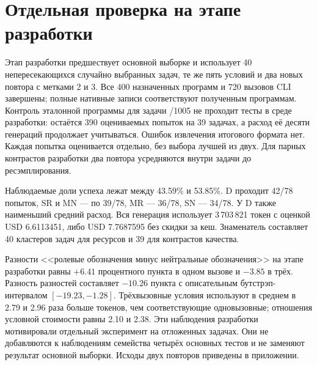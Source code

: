 \section{Отдельная проверка на этапе разработки}
\label{sec:dev40-results}
Этап разработки предшествует основной выборке и использует 40 непересекающихся случайно выбранных задач, те же пять условий и два новых повтора с метками 2 и 3. Все 400 назначенных программ и 720 вызовов CLI завершены; полные нативные записи соответствуют полученным программам. Контроль эталонной программы для задачи /1005 не проходит тесты в среде разработки: остаётся 390 оцениваемых попыток на 39 задачах, а расход её десяти генераций продолжает учитываться. Ошибок извлечения итогового формата нет. Каждая попытка оценивается отдельно, без выбора лучшей из двух. Для парных контрастов разработки два повтора усредняются внутри задачи до ресэмплирования.



Наблюдаемые доли успеха лежат между 43.59\% и 53.85\%. D проходит 42/78 попыток, SR и MN --- по 39/78, MR --- 36/78, SN --- 34/78. У D также наименьший средний расход. Вся генерация использует 3\,703\,821 токен с оценкой USD 6.6113451, либо USD 7.7687595 без скидки за кеш. Знаменатель составляет 40 кластеров задач для ресурсов и 39 для контрастов качества.



Разности <<ролевые обозначения минус нейтральные обозначения>> на этапе разработки равны $+6.41$ процентного пункта в одном вызове и $-3.85$ в трёх. Разность разностей составляет $-10.26$ пункта с описательным бутстрэп-интервалом $[-19.23,-1.28]$. Трёхвызовные условия используют в среднем в 2.79 и 2.96 раза больше токенов, чем соответствующие одновызовные; отношения условной стоимости равны 2.10 и 2.38. Эти наблюдения разработки мотивировали отдельный эксперимент на отложенных задачах. Они не добавляются к наблюдениям семейства четырёх основных тестов и не заменяют результат основной выборки. Исходы двух повторов приведены в приложении.
